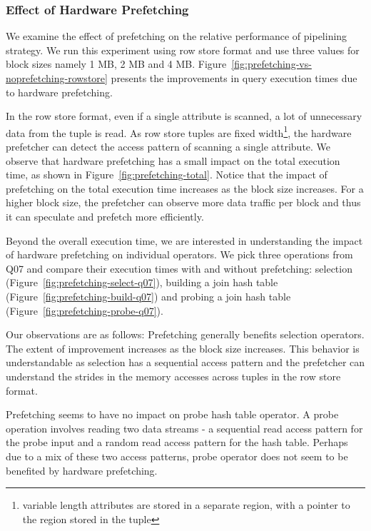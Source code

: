 \subsubsection{Effect of Hardware Prefetching}
We examine the effect of prefetching on the relative performance of pipelining strategy. 
We run this experiment using row store format and use three values for block sizes namely 1 MB, 2 MB and 4 MB.
Figure~\ref{fig:prefetching-vs-noprefetching-rowstore} presents the improvements in query execution times due to hardware prefetching. 

In the row store format, even if a single attribute is scanned, a lot of unnecessary data from the tuple is read.
As row store tuples are fixed width\footnote{variable length attributes are stored in a separate region, with a pointer to the region stored in the tuple}, the hardware prefetcher can detect the access pattern of scanning a single attribute. 
We observe that hardware prefetching has a small impact on the total execution time, as shown in Figure~\ref{fig:prefetching-total}. 
Notice that the impact of prefetching on the total execution time increases as the block size increases. 
For a higher block size, the prefetcher can observe more data traffic per block and thus it can speculate and prefetch more efficiently. 

Beyond the overall execution time, we are interested in understanding the impact of hardware prefetching on individual operators. 
We pick three operations from Q07 and compare their execution times with and without prefetching: selection (Figure~\ref{fig:prefetching-select-q07}), building a join hash table (Figure~\ref{fig:prefetching-build-q07}) and probing a join hash table (Figure~\ref{fig:prefetching-probe-q07}).

Our observations are as follows:
Prefetching generally benefits selection operators. 
The extent of improvement increases as the block size increases. 
This behavior is understandable as selection has a sequential access pattern and the prefetcher can understand the strides in the memory accesses across tuples in the row store format.

Prefetching seems to have no impact on probe hash table operator.
A probe operation involves reading two data streams - a sequential read access pattern for the probe input and a random read access pattern for the hash table. 
Perhaps due to a mix of these two access patterns, probe operator does not seem to be benefited by hardware prefetching. 

